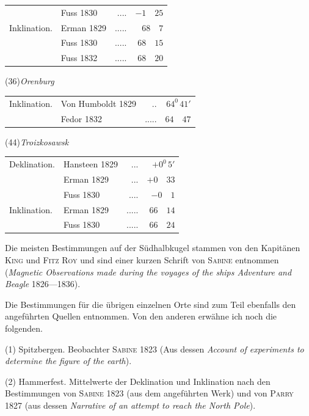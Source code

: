 \begin{center}
\begin{minipage}[t]{\linewidth}
\begin{tabular}{llrr}
&Fuss 1830&.\quad.\quad.\quad.&$-1\quad25$\\
Inklination.&Erman 1829&.\quad.\quad.\quad.\quad.&$68\quad7$\\
&Fuss 1830&.\quad.\quad.\quad.\quad.&$68\quad15$\\
&Fuss 1832&.\quad.\quad.\quad.\quad.&$68\quad20$
\end{tabular}
\end{minipage}\par\medskip
\begin{minipage}[t]{\linewidth}\centering
(36)\quad\textit{Orenburg}\par\smallskip
\begin{tabular}{llrr}
Inklination.&Von Humboldt 1829&.\quad.&$64^0\,41'$\\
&Fedor 1832&.\quad.\quad.\quad.\quad.&$64\quad47$
\end{tabular}
\end{minipage}\par\medskip
\begin{minipage}[t]{\linewidth}\centering
(44)\quad\textit{Troizkosawsk}\par\smallskip
\begin{tabular}{llrr}
Deklination.&Hansteen 1829&.\quad.\quad.&$+0^0\,5'$\\
&Erman 1829&.\quad.\quad.&$+0\quad33$\\
&Fuss 1830&.\quad.\quad.\quad.&$-0\quad1$\\
Inklination.&Erman 1829&.\quad.\quad.\quad.\quad.&$66\quad14$\\
&Fuss 1830&.\quad.\quad.\quad.\quad.&$66\quad24$
\end{tabular}
\end{minipage}
\end{center}

Die meisten Bestimmungen auf der Südhalbkugel stammen von den Kapitänen \textsc{King} und \textsc{Fitz Roy} und sind einer kurzen Schrift von \textsc{Sabine} entnommen (\textit{Magnetic Observations made during the voyages of the ships Adventure and Beagle} 1826—1836).

Die Bestimmungen für die übrigen einzelnen Orte sind zum Teil ebenfalls den angeführten Quellen entnommen. Von den anderen erwähne ich noch die folgenden.

(1) Spitzbergen. Beobachter \textsc{Sabine} 1823 (Aus dessen \textit{Account of experiments to determine the figure of the earth}).

(2) Hammerfest. Mittelwerte der Deklination und Inklination nach den Bestimmungen von \textsc{Sabine} 1823 (aus dem angeführten Werk) und von \textsc{Parry} 1827 (aus dessen \textit{Narrative of an attempt to reach the North Pole}).

